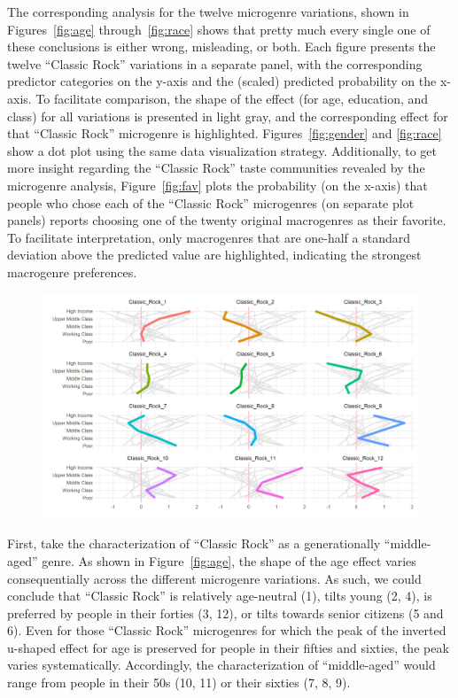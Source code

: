 \documentclass[a4paper,12pt]{extarticle}
\begin{document}
The corresponding analysis for the twelve microgenre variations, shown in Figures~\ref{fig:age} through~\ref{fig:race} shows that pretty much every single one of these conclusions is either wrong, misleading, or both. Each figure presents the twelve ``Classic Rock'' variations in a separate panel, with the corresponding predictor categories on the y-axis and the (scaled) predicted probability on the x-axis. To facilitate comparison, the shape of the effect (for age, education, and class) for all variations is presented in light gray, and the corresponding effect for that ``Classic Rock'' microgenre is highlighted. Figures~\ref{fig:gender} and \ref{fig:race} show a dot plot using the same data visualization strategy. Additionally, to get more insight regarding the ``Classic Rock'' taste communities revealed by the microgenre analysis, Figure~\ref{fig:fav} plots the probability (on the x-axis) that people who chose each of the ``Classic Rock'' microgenres (on separate plot panels) reports choosing one of the twenty original macrogenres as their favorite. To facilitate interpretation, only macrogenres that are one-half a standard deviation above the predicted value are highlighted, indicating the strongest macrogenre preferences.

\begin{figure}[ht!]
    \centering
    \includegraphics[width=1.0\textwidth]{Figs/Link Clust/classic-rock-class.png}
    \caption{}
    \label{fig:class}
\end{figure}
 
First, take the characterization of ``Classic Rock'' as a generationally ``middle-aged'' genre. As shown in Figure~\ref{fig:age}, the shape of the age effect varies consequentially across the different microgenre variations. As such, we could conclude that ``Classic Rock'' is relatively age-neutral (1), tilts young (2, 4), is preferred by people in their forties (3, 12), or tilts towards senior citizens (5 and 6). Even for those ``Classic Rock'' microgenres for which the peak of the inverted u-shaped effect for age is preserved for people in their fifties and sixties, the peak varies systematically. Accordingly, the characterization of ``middle-aged'' would range from people in their 50s (10, 11) or their sixties (7, 8, 9). 
\end{document}
